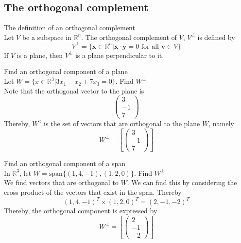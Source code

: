 \documentclass[journal, letterpaper]{IEEEtran}
\begin{document}
    \subsection{The orthogonal complement}
    \begin{mybox}{The definition of an orthogonal complement} \\
        Let $V$ be a subspace in $\mathbb{R}^n$. The orthogonal complement of $V$, $V^\perp$ is defined by
        $$ V^\perp = \{\mathbf{x} \in \mathbb{R}^n | \mathbf{x} \cdot \mathbf{y} = 0 \text{ for all } \mathbf{v} \in V \}$$
        If $V$ is a plane, then $V^\perp$ is a plane perpendicular to it.
    \end{mybox}
    \begin{myboxg}{Find an orthogonal component of a plane} \\ 
        Let $W  = \{x \in \mathbb{R}^3 | 3x_1 - x_2 + 7x_3 = 0 \}$. Find $W^\perp$
        \newline \\ 
        Note that the orthogonal vector to the plane is
        $$ \begin{pmatrix}
            3 \\ -1 \\ 7
        \end{pmatrix}$$
        Thereby, $W^\complement$ is the set of vectors that are orthogonal to the plane $W$, namely
        $$ W^\perp =\left[ \begin{pmatrix} 
            3 \\ -1 \\ 7
        \end{pmatrix} \right]$$
    \end{myboxg}
    \begin{myboxg}{Find an orthogonal component of a span} \\ 
        In $\mathbb{R}^3$, let $W = \text{span}\{(1, 4, -1), (1, 2, 0)\}$. Find $W^\perp$
        \newline \\ 
        We find vectors that are orthogonal to $W$. We can find this by considering the cross product of the vectors that exist in the span. Thereby
        $$ (1, 4, -1)^T \times (1, 2, 0)^T = (2, -1, -2)^T$$
        Thereby, the orthogonal component is expressed by
        $$ W^\perp = \left[\begin{pmatrix}
            2 \\ -1 \\ -2
        \end{pmatrix} \right]$$
    \end{myboxg}
\end{document}
